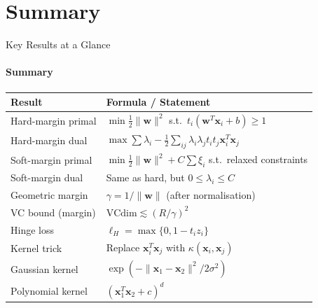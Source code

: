 \section{Summary}

\begin{frame}{Key Results at a Glance}
  \framesubtitle{Summary}
  \begin{center}
    \renewcommand{\arraystretch}{1.4}
    \footnotesize
    \begin{tabular}{ll}
      \toprule
      Result & Formula / Statement \\
      \midrule
      Hard-margin primal & $\min \tfrac{1}{2}\|\mathbf{w}\|^2$ s.t.\ $t_i(\mathbf{w}^T\mathbf{x}_i+b)\ge 1$ \\
      Hard-margin dual & $\max \sum\lambda_i - \tfrac{1}{2}\sum_{ij}\lambda_i\lambda_j t_it_j\mathbf{x}_i^T\mathbf{x}_j$ \\
      Soft-margin primal & $\min \tfrac{1}{2}\|\mathbf{w}\|^2 + C\sum\xi_i$ s.t.\ relaxed constraints \\
      Soft-margin dual & Same as hard, but $0\le\lambda_i\le C$ \\
      Geometric margin & $\gamma = 1/\|\mathbf{w}\|$ (after normalisation) \\
      VC bound (margin) & $\mathrm{VCdim}\lesssim(R/\gamma)^2$ \\
      Hinge loss & $\ell_H = \max\{0, 1-t_i z_i\}$ \\
      Kernel trick & Replace $\mathbf{x}_i^T\mathbf{x}_j$ with $\kappa(\mathbf{x}_i,\mathbf{x}_j)$ \\
      Gaussian kernel & $\exp(-\|\mathbf{x}_1-\mathbf{x}_2\|^2/2\sigma^2)$ \\
      Polynomial kernel & $(\mathbf{x}_1^T\mathbf{x}_2+c)^d$ \\
      \bottomrule
    \end{tabular}
  \end{center}
\end{frame}


